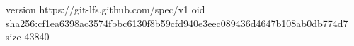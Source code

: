 version https://git-lfs.github.com/spec/v1
oid sha256:cf1ea6398ac3574fbbc6130f8b59cfd940e3eec089436d4647b108ab0db774d7
size 43840
